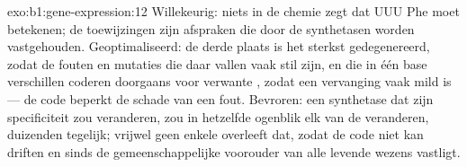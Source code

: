 \begin{solution}{exo:b1:gene-expression:12}
Willekeurig: niets in de chemie zegt dat UUU Phe moet betekenen; de toewijzingen
zijn afspraken die door de synthetasen worden vastgehouden. Geoptimaliseerd: de
derde plaats is het sterkst gedegenereerd, zodat de fouten en mutaties die daar
vallen vaak stil zijn, en  die in één base verschillen coderen doorgaans voor
verwante , zodat een vervanging vaak mild is --- de code beperkt de schade
van een fout. Bevroren: een synthetase dat zijn specificiteit zou veranderen, zou
in hetzelfde ogenblik elk  van de  veranderen, duizenden tegelijk; vrijwel
geen enkele  overleeft dat, zodat de code niet kan driften en sinds de
gemeenschappelijke voorouder van alle levende wezens vastligt.
\end{solution}

